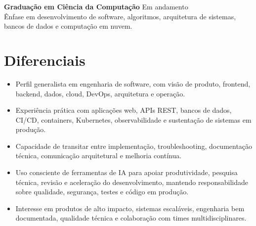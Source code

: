 \documentclass[10pt,a4paper]{article}
\begin{document}
\vspace{0.35em}

\textbf{Graduação em Ciência da Computação} \hfill Em andamento\\
Ênfase em desenvolvimento de software, algoritmos, arquitetura de sistemas, bancos de dados e computação em nuvem.

\section*{Diferenciais}
\begin{itemize}
  \item Perfil generalista em engenharia de software, com visão de produto, frontend, backend, dados, cloud, DevOps, arquitetura e operação.
  \item Experiência prática com aplicações web, APIs REST, bancos de dados, CI/CD, containers, Kubernetes, observabilidade e sustentação de sistemas em produção.
  \item Capacidade de transitar entre implementação, troubleshooting, documentação técnica, comunicação arquitetural e melhoria contínua.
  \item Uso consciente de ferramentas de IA para apoiar produtividade, pesquisa técnica, revisão e aceleração do desenvolvimento, mantendo responsabilidade sobre qualidade, segurança, testes e código em produção.
  \item Interesse em produtos de alto impacto, sistemas escaláveis, engenharia bem documentada, qualidade técnica e colaboração com times multidisciplinares.
\end{itemize}
\end{document}
